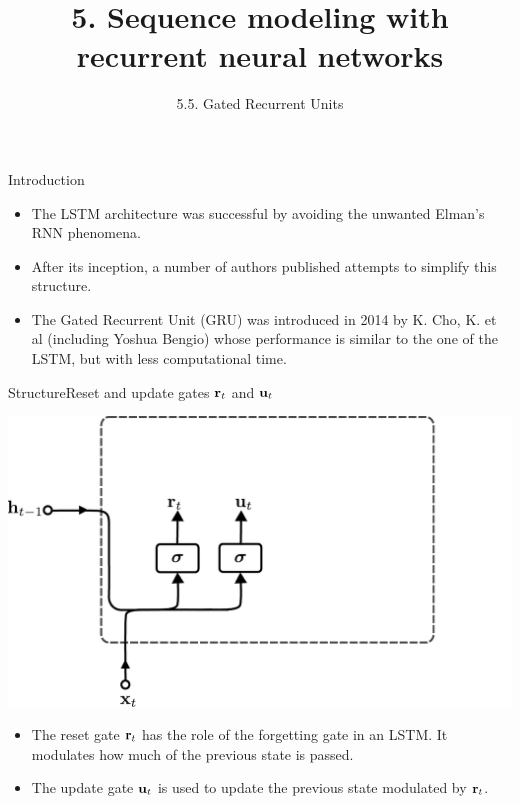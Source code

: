 \documentclass{beamer}
\title{5. Sequence modeling with recurrent neural networks}
\subtitle{5.5. Gated Recurrent Units}
\begin{document}
\maketitle

\begin{frame}{Introduction}
\begin{itemize} 
\item The LSTM architecture was successful by avoiding the unwanted Elman's RNN phenomena. 
\item After its inception, a number of authors published attempts to simplify this structure. 
\item The Gated Recurrent Unit (GRU) was introduced in 2014 by K. Cho, K. et al (including Yoshua Bengio) whose performance is similar to the one of the LSTM, but with less computational time. 
\end{itemize}
\end{frame}


\begin{frame}{Structure}{Reset and update gates ${\bf r}_t$  and ${\bf u}_t$}
\begin{center}
    \includegraphics[scale=0.4]{Module 5 (RNN)/pics/GRU_reset_update.pdf}
\end{center}

\begin{itemize} 
\item The reset gate ${\bf r}_t$ has the role of the forgetting gate in an LSTM. It modulates how much of the previous state is passed. 
\item The update gate ${\bf u}_t$ is used to update the previous state modulated by ${\bf r}_t$.  
\end{itemize}
\end{frame}
\end{document}
